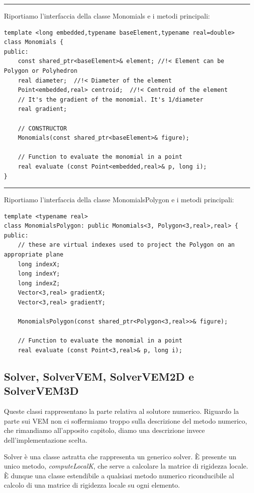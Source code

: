 \documentclass[oneside,12pt]{book}  %
\theoremstyle{plain}
\theoremstyle{definition}
\theoremstyle{remark}
\numberwithin{equation}{chapter} %
\begin{document}
\noindent\rule{14cm}{1pt}

Riportiamo l'interfaccia della classe Monomials e i metodi principali:

\begin{verbatim}
template <long embedded,typename baseElement,typename real=double>
class Monomials {
public:
    const shared_ptr<baseElement>& element;	//!< Element can be Polygon or Polyhedron
    real diameter;  //!< Diameter of the element
    Point<embedded,real> centroid;  //!< Centroid of the element
    // It's the gradient of the monomial. It's 1/diameter
    real gradient;

    // CONSTRUCTOR
    Monomials(const shared_ptr<baseElement>& figure);

    // Function to evaluate the monomial in a point
    real evaluate (const Point<embedded,real>& p, long i);
}

\end{verbatim}



\noindent\rule{14cm}{1pt}

Riportiamo l'interfaccia della classe MonomialsPolygon e i metodi principali:

\begin{verbatim}
template <typename real>
class MonomialsPolygon: public Monomials<3, Polygon<3,real>,real> {
public:
    // these are virtual indexes used to project the Polygon on an appropriate plane
    long indexX;
    long indexY;
    long indexZ;
    Vector<3,real> gradientX;
    Vector<3,real> gradientY;
	
    MonomialsPolygon(const shared_ptr<Polygon<3,real>>& figure); 

    // Function to evaluate the monomial in a point
    real evaluate (const Point<3,real>& p, long i);

\end{verbatim}

\subsection{Solver, SolverVEM, SolverVEM2D e SolverVEM3D}
Queste classi rappresentano la parte relativa al solutore numerico. 
Riguardo la parte sui VEM non ci soffermiamo troppo sulla descrizione
del metodo numerico, che rimandiamo all'apposito capitolo, diamo una
descrizione invece dell'implementazione scelta.

Solver \`e una classe astratta che rappresenta un generico
solver. \`E presente un unico metodo, \textit{computeLocalK}, che
serve a calcolare la matrice di rigidezza locale. \`E dunque una
classe estendibile a qualsiasi metodo numerico riconducibile al
calcolo di una matrice di rigidezza locale su ogni elemento.
\end{document}
